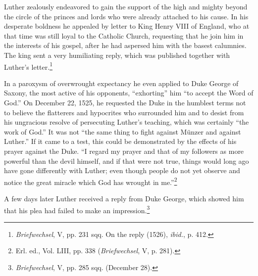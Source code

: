 Luther zealously endeavored to gain the support of the high and
mighty beyond the circle of the princes and lords who were already
attached to his cause. In his desperate boldness he appealed by letter
to King Henry VIII of England, who at that time was still loyal to
the Catholic Church, requesting that he join him in the interests of
his gospel, after he had aspersed him with the basest calumnies. The
king sent a very humiliating reply, which was published together
with Luther’s letter.\footnote
{\textit{Briefwechsel}, V, pp. 231 sqq. On the reply (1526), \textit{ibid.}, p. 412.}

In a paroxysm of overwrought expectancy he even applied to Duke
George of Saxony, the most active of his opponents, “exhorting” him
“to accept the Word of God.” On December 22, 1525, he requested
the Duke in the humblest terms not to believe the flatterers and hypocrites
who surrounded him and to desist from his ungracious resolve
of persecuting Luther’s teaching, which was certainly “the work of
God.” It was not “the same thing to fight against Münzer and
against Luther.” If it came to a test, this could be demonstrated by
the effects of his prayer against the Duke. “I regard my prayer and
that of my followers as more powerful than the devil himself, and if
that were not true, things would long ago have gone differently with
Luther; even though people do not yet observe and notice the great
miracle which God has wrought in me.”\footnote{Erl. ed., Vol. LIII, pp. 338 (\textit{Briefwechsel}, V, p. 281).}

A few days later Luther received a reply from Duke George, which
showed him that his plea had failed to make an impression.\footnote
{\textit{Briefwechsel}, V, pp. 285 sqq. (December 28).}

